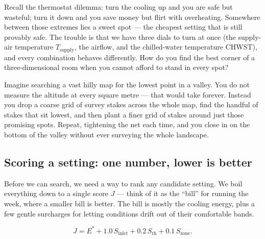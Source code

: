 Recall the thermostat dilemma: turn the cooling up and you are safe but wasteful; turn it down and you save money but flirt with overheating. Somewhere between those extremes lies a sweet spot --- the cheapest setting that is still provably safe. The trouble is that we have three dials to turn at once (the supply-air temperature $T_{\text{supply}}$, the airflow, and the chilled-water temperature CHWST), and every combination behaves differently. How do you find the best corner of a three-dimensional room when you cannot afford to stand in every spot?

\begin{analogy}
Imagine searching a vast hilly map for the lowest point in a valley. You do not measure the altitude at every square metre --- that would take forever. Instead you drop a coarse grid of survey stakes across the whole map, find the handful of stakes that sit lowest, and then plant a finer grid of stakes around just those promising spots. Repeat, tightening the net each time, and you close in on the bottom of the valley without ever surveying the whole landscape.
\end{analogy}

\subsection{Scoring a setting: one number, lower is better}

Before we can search, we need a way to rank any candidate setting. We boil everything down to a single score $J$ --- think of it as the ``bill'' for running the week, where a smaller bill is better. The bill is mostly the cooling energy, plus a few gentle surcharges for letting conditions drift out of their comfortable bands.

\begin{equation}
\label{eq:objective}
J = E^{*} + 1.0\,S_{\text{inlet}} + 0.2\,S_{\text{rh}} + 0.1\,S_{\text{zone}}.
\end{equation}

